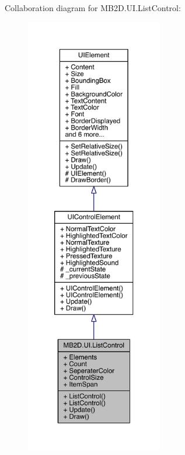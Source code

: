 Collaboration diagram for M\+B2\+D.\+U\+I.\+List\+Control\+:
\nopagebreak
\begin{figure}[H]
\begin{center}
\leavevmode
\includegraphics[height=550pt]{class_m_b2_d_1_1_u_i_1_1_list_control__coll__graph}
\end{center}
\end{figure}
